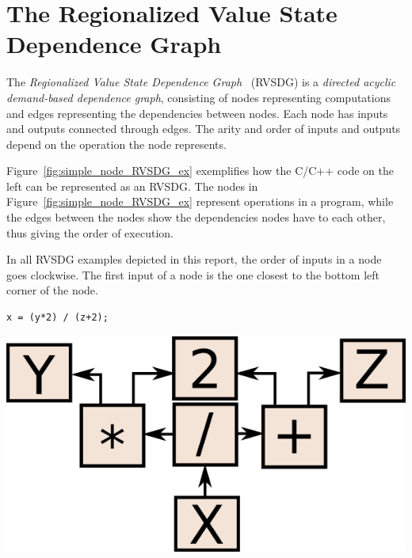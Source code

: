 
\clearpage
\section{The Regionalized Value State Dependence Graph}
\label{background:RVSDG}

The \textit{Regionalized Value State Dependence Graph}~\cite{RVSDG:HiPEACpaper}
(RVSDG) is a \textit{directed acyclic demand-based dependence graph},
consisting of nodes representing computations and edges representing the
dependencies between nodes. Each node has inputs and outputs connected through
edges. The arity and order of inputs and outputs depend on the operation the
node represents.

Figure~\ref{fig:simple_node_RVSDG_ex} exemplifies how the C/C++ code on the left
can be represented as an RVSDG. The nodes in
Figure~\ref{fig:simple_node_RVSDG_ex} represent operations in a program, while
the edges between the nodes show the dependencies nodes have to each other, thus
giving the order of execution.

In all RVSDG examples depicted in this report, the order of inputs in a node
goes clockwise. The first input of a node is the one closest to the bottom left
corner of the node.

\begin{centering}
	\noindent\begin{minipage}{0.36\textwidth}
		\begin{CenteredBox}
		\begin{lstlisting}[label={lst:simple_node_RVSDG_ex},
style=minipage_customcpp, basicstyle=\fontsize{10}{1}]
x = (y*2) / (z+2);
		\end{lstlisting}
		\end{CenteredBox}
	\end{minipage}
	\noindent\begin{minipage}{0.55\textwidth}
		\captionsetup{type=figure}
		\includegraphics[width=\textwidth]{figures/simple_node_RVSDG_ex}
	\end{minipage}
	\label{fig:simple_node_RVSDG_ex}
\end{centering}

